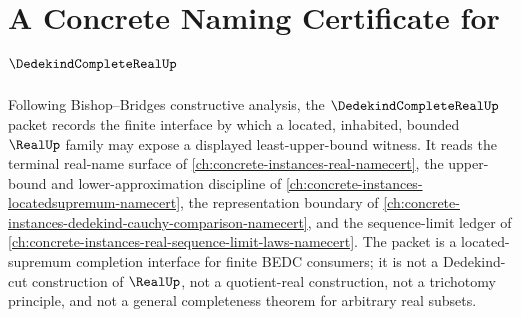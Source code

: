 \chapter{A Concrete Naming Certificate for $\DedekindCompleteRealUp$}
\label{ch:concrete-instances-dedekind-complete-real-namecert}

Following Bishop--Bridges constructive analysis, the $\DedekindCompleteRealUp$ packet records the finite interface by which a located, inhabited, bounded $\RealUp$ family may expose a displayed least-upper-bound witness. It reads the terminal real-name surface of \autoref{ch:concrete-instances-real-namecert}, the upper-bound and lower-approximation discipline of \autoref{ch:concrete-instances-locatedsupremum-namecert}, the representation boundary of \autoref{ch:concrete-instances-dedekind-cauchy-comparison-namecert}, and the sequence-limit ledger of \autoref{ch:concrete-instances-real-sequence-limit-laws-namecert}. The packet is a located-supremum completion interface for finite BEDC consumers; it is not a Dedekind-cut construction of $\RealUp$, not a quotient-real construction, not a trichotomy principle, and not a general completeness theorem for arbitrary real subsets.

